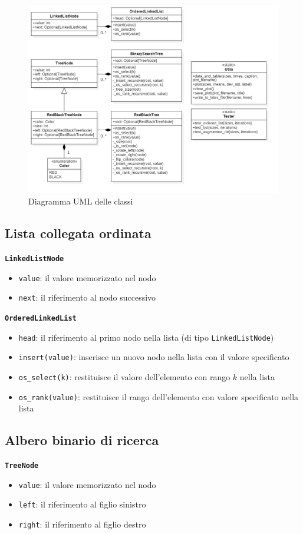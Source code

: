 \documentclass[onecolumn]{article}
\begin{document}
\begin{figure}[h!]
	\includegraphics[width=\linewidth]{classi.png}
	\caption{Diagramma UML delle classi}
	\label{fig:classi}
\end{figure}

\subsection{Lista collegata ordinata}
\texttt{\textbf{LinkedListNode}}
\begin{itemize}
	\setlength\itemsep{0em}
	\item \verb|value|: il valore memorizzato nel nodo
	\item \verb|next|: il riferimento al nodo successivo
\end{itemize}

{\setlength{\parindent}{0em} \texttt{\textbf{OrderedLinkedList}}}
\begin{itemize}
	\setlength\itemsep{0em}
	\item \verb|head|: il riferimento al primo nodo nella lista (di tipo \texttt{LinkedListNode})
	\item \verb|insert(value)|: inserisce un nuovo nodo nella lista con il valore specificato 
	\item \verb|os_select(k)|: restituisce il valore dell'elemento con rango $k$ nella lista
	\item \verb|os_rank(value)|: restituisce il rango dell'elemento con valore specificato nella lista
\end{itemize}

\subsection{Albero binario di ricerca}
\texttt{\textbf{TreeNode}}
\begin{itemize}
	\setlength\itemsep{0em}
	\item \verb|value|: il valore memorizzato nel nodo
	\item \verb|left|: il riferimento al figlio sinistro
	\item \verb|right|: il riferimento al figlio destro
\end{itemize}
\end{document}
